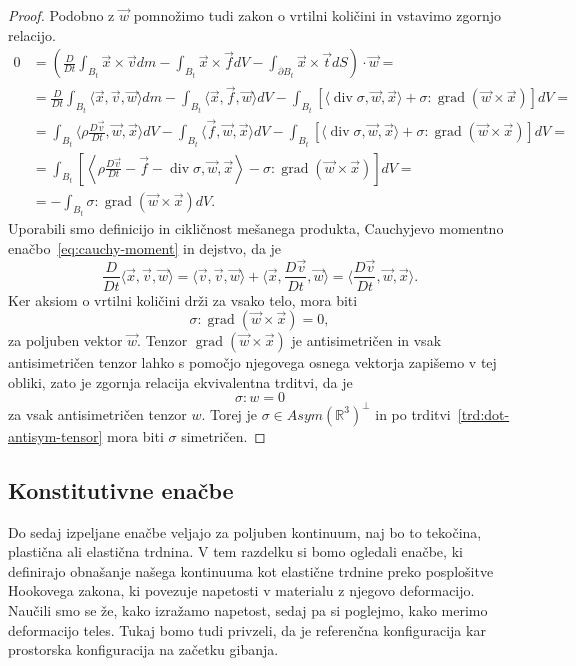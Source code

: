 \documentclass[12pt,a4paper,twoside]{article}
\theoremstyle{definition} %
\theoremstyle{plain} %
\numberwithin{equation}{section}
\newcommand{\R}{\mathbb R}
\renewcommand{\div}{\operatorname{div}}
\newcommand{\grad}{\operatorname{grad}}
\newcommand{\DD}[2]{\ensuremath{\frac{D #1}{D #2}}}
\newcommand{\DDt}[1]{\DD{#1}{t}}
\newcommand{\vv}{\vec{v}}
\newcommand{\vt}{\vec{t}}
\newcommand{\vw}{\vec{w}}
\newcommand{\vf}{\vec{f}}
\newcommand{\vx}{\vec{x}}
\newcommand{\ts}{\sigma}
\begin{document}
\begin{proof}
Podobno z $\vw$ pomnožimo tudi zakon o vrtilni količini in vstavimo zgornjo
relacijo.
\begin{align*}
  0 &= \left(\DDt{}\int_{B_t}\vx \times \vv dm - \int_{B_t} \vx \times \vf dV -
  \int_{\partial B_t} \vx\times\vt dS\right)\cdot \vw = \\ &=
  \DDt{}\int_{B_t}\langle \vx, \vv, \vw\rangle  dm - \int_{B_t} \langle \vx,
  \vf, \vw\rangle dV - \int_{B_t} [\langle \div \ts, \vw, \vx\rangle +  \ts :
  \grad (\vw \times \vx)] dV = \\ &=
  \int_{B_t}\langle \rho \DDt\vv, \vw, \vx \rangle  dV - \int_{B_t} \langle \vf,
  \vw, \vx\rangle dV - \int_{B_t} [\langle \div \ts, \vw, \vx\rangle +  \ts :
  \grad (\vw \times \vx)] dV = \\ &=
\int_{B_t}\left[ \left\langle\rho \DDt\vv - \vf - \div \ts, \vw, \vx\right\rangle -  \ts : \grad
  (\vw \times \vx)\right] dV = \\ &=
- \int_{B_t} \ts : \grad (\vw \times \vx) dV.
\end{align*}
Uporabili smo definicijo in cikličnost mešanega produkta, Cauchyjevo momentno
enačbo~\eqref{eq:cauchy-moment} in dejstvo, da je
\[
  \DDt{}\langle \vx, \vv, \vw \rangle =
  \langle \vv, \vv, \vw \rangle +
  \langle \vx, \DDt\vv, \vw \rangle =
  \langle \DDt\vv, \vw, \vx \rangle.
\]
Ker aksiom o vrtilni količini drži za vsako telo, mora biti
\[
  \ts : \grad (\vw \times \vx) = 0,
\]
za poljuben vektor $\vw$. Tenzor $\grad (\vw \times \vx)$ je antisimetričen in
vsak antisimetričen tenzor lahko s pomočjo njegovega osnega vektorja zapišemo v
tej obliki, zato je zgornja relacija ekvivalentna trditvi, da je
\[ \ts : w = 0\] za vsak antisimetričen tenzor $w$.
Torej je $\ts \in Asym(\R^3)^\perp$ in po trditvi~\ref{trd:dot-antisym-tensor}
mora biti $\ts$ simetričen.
\end{proof}

\subsection{Konstitutivne enačbe}
Do sedaj izpeljane enačbe veljajo za poljuben kontinuum, naj bo to tekočina, plastična ali elastična
trdnina. V tem razdelku si bomo ogledali enačbe, ki definirajo obnašanje našega kontinuuma kot
elastične trdnine preko posplošitve Hookovega zakona, ki povezuje napetosti v materialu z njegovo
deformacijo. Naučili smo se že, kako izražamo napetost, sedaj pa si poglejmo, kako merimo
deformacijo teles. Tukaj bomo tudi privzeli, da je referenčna konfiguracija kar prostorska
konfiguracija na začetku gibanja.
\end{document}
